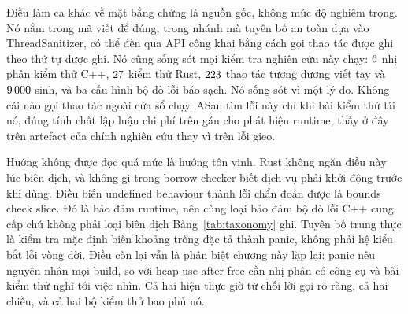 Điều làm ca khác về mặt bằng chứng là nguồn gốc, không mức độ nghiêm trọng. Nó nằm trong
mã viết để đúng, trong nhánh mà tuyên bố an toàn dựa vào ThreadSanitizer, có thể đến
qua API công khai bằng cách gọi thao tác được ghi theo thứ tự được ghi. Nó cũng sống sót
mọi kiểm tra nghiên cứu này chạy: $6$ nhị phân kiểm thử C++, $27$ kiểm thử Rust,
$223$ thao tác tương đương viết tay và $9\,000$ sinh, và ba
cấu hình bộ dò lỗi báo sạch. Nó sống sót vì một lý do. Không cái nào gọi thao tác ngoài
cửa sổ chạy. ASan tìm lỗi này chỉ khi bài kiểm thử lái nó, đúng tính chất
lập luận chi phí trên gán cho phát hiện runtime, thấy ở đây trên artefact của chính nghiên cứu thay
vì trên lỗi gieo.

Hướng không được đọc quá mức là hướng tôn vinh. Rust không
ngăn điều này lúc biên dịch, và không gì trong borrow checker biết dịch vụ phải
khởi động trước khi dùng. Điều biến undefined behaviour thành lỗi chẩn đoán được là
bounds check slice. Đó là bảo đảm runtime, nên cùng loại bảo đảm
bộ dò lỗi C++ cung cấp chứ không phải loại biên dịch Bảng~\ref{tab:taxonomy} ghi. Tuyên bố
trung thực là kiểm tra mặc định biến khoảng trống đặc tả thành panic, không phải hệ kiểu bắt lỗi vòng đời. Điều còn lại vẫn là phân biệt chương này
lặp lại: panic nêu nguyên nhân mọi build, so với heap-use-after-free cần
nhị phân có công cụ và bài kiểm thử nghĩ tới việc nhìn. Cả hai hiện thực giờ từ chối
lời gọi rõ ràng, cả hai chiều, và cả hai bộ kiểm thử bao phủ nó.

